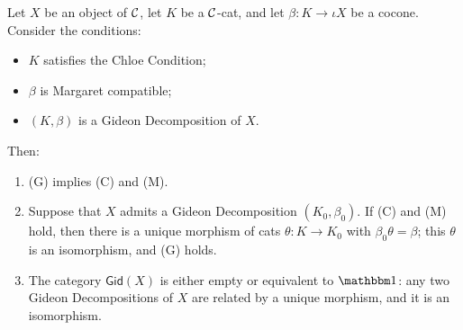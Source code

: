 \begin{theorem}\label{thm:cmg}
Let $X$ be an object of $\mathcal{C}$, let $K$ be a $\mathcal{C}$-cat, and let $\beta\colon K\to\iota X$
be a cocone. Consider the conditions:
\begin{itemize}
\item[\textup{(C)}] $K$ satisfies the Chloe Condition;
\item[\textup{(M)}] $\beta$ is Margaret compatible;
\item[\textup{(G)}] $(K,\beta)$ is a Gideon Decomposition of $X$.
\end{itemize}
Then:
\begin{enumerate}
\item\label{it:cmg-forward} \textup{(G)} implies \textup{(C)} and \textup{(M)}.
\item\label{it:cmg-backward} Suppose that $X$ admits a Gideon Decomposition
  $(K_0,\beta_0)$. If \textup{(C)} and \textup{(M)} hold, then there is a unique
  morphism of cats $\theta\colon K\to K_0$ with $\beta_0\theta=\beta$; this
  $\theta$ is an isomorphism, and \textup{(G)} holds.
\item\label{it:cmg-unique} The category $\mathsf{Gid}(X)$ is either empty or
  equivalent to $\one$: any two Gideon Decompositions of $X$ are related by a
  unique morphism, and it is an isomorphism.
\end{enumerate}
\end{theorem}

